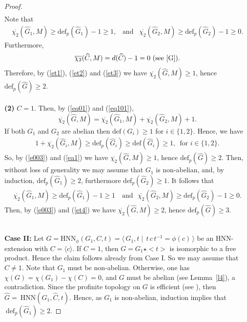 \documentclass[10pt]{amsart}
\theoremstyle{plain}
\theoremstyle{definition}
\theoremstyle{remark}
\numberwithin{prop}{section}
\numberwithin{example}{section}
\numberwithin{equation}{section}
\newcommand{\de}{\mathrm{def}}
\newcommand{\HNN}{\mathrm{HNN}}
\begin{document}
\begin{proof}
\begin{align}
		\end{align}
		Note that  
		\begin{align}\label{et2}
				\overline{\chi_2}(\widehat{G}_1,M)\geq \de_p(\widehat{G}_1)-1\geq 1,\,\,\,\,\, \text{and}\,\,\,\,\, 	\overline{\chi_2}(\widehat{G}_2,M)\geq \de_p(\widehat{G}_2)-1\geq 0.
		\end{align} 
		Furthermore, 
		\begin{align}\label{et3}
				\overline{\chi_2}(\widehat{C},M)=d(\widehat{C})-1=0\,\,\text{(see  \cite[\S 2, Example~2.6]{G})}.
		\end{align} Therefore, by (\ref{et1}), (\ref{et2}) and (\ref{et3})  we have  
		$\overline{\chi_2}(\widehat{G},M)\geq 1$, hence $\de_p(\widehat{G})\geq 2$.\\
		\noindent
		\\{\bf (2)}
		$C=1$. Then, by  (\ref{eq01}) and (\ref{eq101}),  
		\begin{equation}\label{e003}
			\overline{\chi_2}(\widehat{G},M)=	\overline{\chi_2}(\widehat{G}_1,M)+	\overline{\chi_2}(\widehat{G}_2,M)+1.
		\end{equation}
		If both $G_1$ and $G_2$   are abelian  then $\de(G_i)\geq 1$  for $i\in \{1,2\}$. Hence, we have 
		\begin{align}\label{ea1}
			1+	\overline{\chi_2}(\widehat{G}_i,M)\geq \de_p(\widehat{G}_i)\geq \de(\widehat{G}_i)\geq 1, \,\,\, \text{for}\,\, i\in \{1,2\}.
		\end{align}
		So, by (\ref{e003}) and  (\ref{ea1}) we have $	\overline{\chi_2}(\widehat{G},M)\geq 1$, hence $\de_p(\widehat{G})\geq 2$.  Then, without loss of generality we may assume that $G_1$ is non-abelian, and,
		by induction, $\de_p(\widehat{G}_1)\geq 2$, furthermore  $\de_p(\widehat{G}_2)\geq 1$.  It follows that  
		\begin{align}\label{et4}
				\overline{\chi_2}(\widehat{G}_1,M)\geq \de_p(\widehat{G}_1)-1\geq 1\,\,\,\,\,\, \text{and}\,\,\,\, 	\overline{\chi_2}(\widehat{G}_2,M)\geq \de_p(\widehat{G}_2)-1\geq 0.
		\end{align}
		Then, by (\ref{e003}) and (\ref{et4}) we have  $	\overline{\chi_2}(\widehat{G},M)\geq 2$, hence  $\de_p(\widehat{G})\geq 3$.
		
		\noindent\\
		{\bf Case II:} Let  $G=\HNN_\phi(G_1,C,t)=
		\langle\, G_1,t\mid\,t\,c\,t^{-1}=\phi(c)\,\rangle$ be an HNN-extension
		with   $C=\langle c \rangle$. If $C=1$, then $G=G_1\star  <t>$ is isomorphic to a free product.
		Hence the claim follows already from Case I. So we may assume that $C\not=1$.
		Note that $G_1$ must be non-abelian.
		Otherwise, one has $\chi(G)=\chi(G_1)-\chi(C)=0$, 
		and $G$ must be abelian (see  Lemma~\ref{l4}), a contradiction.	Since the profinite topology on $G$ is efficient (see  \cite[\S 3, Thm.~3.8]{gru} ), then  $\widehat{G}=~\HNN(\widehat{G}_1,\widehat{C},t)$. Hence, as  $G_1$ is non-abelian,   induction implies that $~\de_p(\widehat{G}_1)\geq2$. 
		

\end{proof}
\end{document}
